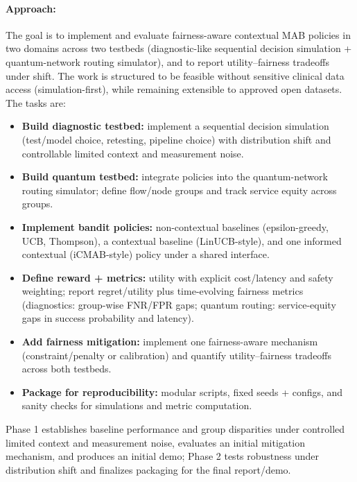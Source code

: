 \documentclass[12pt]{article}
\begin{document}
\paragraph{Approach:} \hspace{-5mm}
The goal is to implement and evaluate fairness-aware contextual MAB policies in two domains across two testbeds (diagnostic-like sequential decision simulation + quantum-network routing simulator), and to report utility--fairness tradeoffs under shift. The work is structured to be feasible without sensitive clinical data access (simulation-first), while remaining extensible to approved open datasets. The tasks are:
\begin{itemize}
\item {\bf Build diagnostic testbed:} implement a sequential decision simulation (test/model choice, retesting, pipeline choice) with distribution shift and controllable limited context and measurement noise.
\item {\bf Build quantum testbed:} integrate policies into the quantum-network routing simulator; define flow/node groups and track service equity across groups.
\item {\bf Implement bandit policies:} non-contextual baselines (epsilon-greedy, UCB, Thompson), a contextual baseline (LinUCB-style), and one informed contextual (iCMAB-style) policy under a shared interface.
\item {\bf Define reward + metrics:} utility with explicit cost/latency and safety weighting; report regret/utility plus time-evolving fairness metrics (diagnostics: group-wise FNR/FPR gaps; quantum routing: service-equity gaps in success probability and latency).
\item {\bf Add fairness mitigation:} implement one fairness-aware mechanism (constraint/penalty or calibration) and quantify utility--fairness tradeoffs across both testbeds.
\item {\bf Package for reproducibility:} modular scripts, fixed seeds + configs, and sanity checks for simulations and metric computation.
\end{itemize}
Phase 1 establishes baseline performance and group disparities under controlled limited context and measurement noise, evaluates an initial mitigation mechanism, and produces an initial demo; Phase 2 tests robustness under distribution shift and finalizes packaging for the final report/demo.
\end{document}
